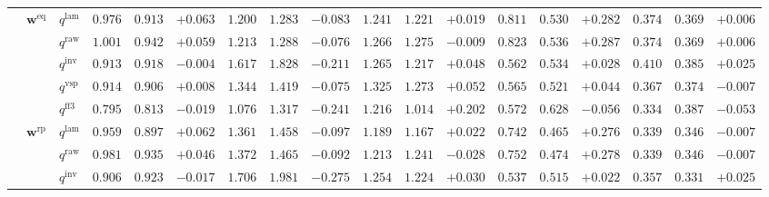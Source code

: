 \documentclass{article}
\begin{document}
\begin{table}[!htbp]
{\begin{tabular}{lll ccc ccc ccc ccc ccc}
\cmidrule(lr){2-18}
 & $\mathbf{w}^{\mathrm{eq}}$ & $q^{\mathrm{lam}}$ & $0.976$ & $0.913$ & \cellcolor{posgreen!50}$+0.063$ & $1.200$ & $1.283$ & \cellcolor{negred!50}$-0.083$ & $1.241$ & $1.221$ & \cellcolor{posgreen!50}$+0.019$ & $0.811$ & $0.530$ & \cellcolor{posgreen!50}$+0.282$ & $0.374$ & $0.369$ & \cellcolor{posgreen!50}$+0.006$ \\
 &  & $q^{\mathrm{raw}}$ & $1.001$ & $0.942$ & \cellcolor{posgreen!50}$+0.059$ & $1.213$ & $1.288$ & \cellcolor{negred!50}$-0.076$ & $1.266$ & $1.275$ & \cellcolor{negred!50}$-0.009$ & $0.823$ & $0.536$ & \cellcolor{posgreen!50}$+0.287$ & $0.374$ & $0.369$ & \cellcolor{posgreen!50}$+0.006$ \\
 &  & $q^{\mathrm{inv}}$ & $0.913$ & $0.918$ & \cellcolor{negred!50}$-0.004$ & $1.617$ & $1.828$ & \cellcolor{negred!50}$-0.211$ & $1.265$ & $1.217$ & \cellcolor{posgreen!50}$+0.048$ & $0.562$ & $0.534$ & \cellcolor{posgreen!50}$+0.028$ & $0.410$ & $0.385$ & \cellcolor{posgreen!50}$+0.025$ \\
 &  & $q^{\mathrm{vsp}}$ & $0.914$ & $0.906$ & \cellcolor{posgreen!50}$+0.008$ & $1.344$ & $1.419$ & \cellcolor{negred!50}$-0.075$ & $1.325$ & $1.273$ & \cellcolor{posgreen!50}$+0.052$ & $0.565$ & $0.521$ & \cellcolor{posgreen!50}$+0.044$ & $0.367$ & $0.374$ & \cellcolor{negred!50}$-0.007$ \\
 &  & $q^{\mathrm{ff3}}$ & $0.795$ & $0.813$ & \cellcolor{negred!50}$-0.019$ & $1.076$ & $1.317$ & \cellcolor{negred!50}$-0.241$ & $1.216$ & $1.014$ & \cellcolor{posgreen!50}$+0.202$ & $0.572$ & $0.628$ & \cellcolor{negred!50}$-0.056$ & $0.334$ & $0.387$ & \cellcolor{negred!50}$-0.053$ \\
\cmidrule(lr){2-18}
 & $\mathbf{w}^{\mathrm{rp}}$ & $q^{\mathrm{lam}}$ & $0.959$ & $0.897$ & \cellcolor{posgreen!50}$+0.062$ & $1.361$ & $1.458$ & \cellcolor{negred!50}$-0.097$ & $1.189$ & $1.167$ & \cellcolor{posgreen!50}$+0.022$ & $0.742$ & $0.465$ & \cellcolor{posgreen!50}$+0.276$ & $0.339$ & $0.346$ & \cellcolor{negred!50}$-0.007$ \\
 &  & $q^{\mathrm{raw}}$ & $0.981$ & $0.935$ & \cellcolor{posgreen!50}$+0.046$ & $1.372$ & $1.465$ & \cellcolor{negred!50}$-0.092$ & $1.213$ & $1.241$ & \cellcolor{negred!50}$-0.028$ & $0.752$ & $0.474$ & \cellcolor{posgreen!50}$+0.278$ & $0.339$ & $0.346$ & \cellcolor{negred!50}$-0.007$ \\
 &  & $q^{\mathrm{inv}}$ & $0.906$ & $0.923$ & \cellcolor{negred!50}$-0.017$ & $1.706$ & $1.981$ & \cellcolor{negred!50}$-0.275$ & $1.254$ & $1.224$ & \cellcolor{posgreen!50}$+0.030$ & $0.537$ & $0.515$ & \cellcolor{posgreen!50}$+0.022$ & $0.357$ & $0.331$ & \cellcolor{posgreen!50}$+0.025$ \\

\end{tabular}}
\end{table}
\end{document}
